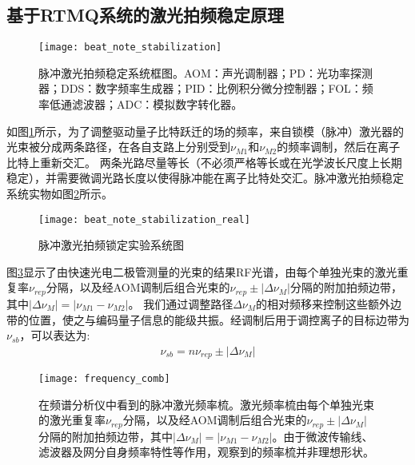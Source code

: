 \subsection[基于RTMQ系统的激光拍频稳定原理]{基于RTMQ系统的激光拍频稳定原理}

\begin{figure}
    \centering
    \caption[脉冲激光拍频稳定系统框图]{脉冲激光拍频稳定系统框图。AOM：声光调制器；PD：光功率探测器；DDS：数字频率生成器；PID：比例积分微分控制器；FOL：频率低通滤波器；ADC：模拟数字转化器。\label{fig:beat_note_stabilization}}
    \texttt{[image: beat\_note\_stabilization]}
\end{figure}

如图\ref{fig:beat_note_stabilization}所示，为了调整驱动量子比特跃迁的场的频率，来自锁模（脉冲）激光器的光束被分成两条路径，在各自支路上分别受到$\nu_{M1}$和$\nu_{M2}$的频率调制，然后在离子比特上重新交汇。
两条光路尽量等长（不必须严格等长或在光学波长尺度上长期稳定），并需要微调光路长度以使得脉冲能在离子比特处交汇。脉冲激光拍频稳定系统实物如图\ref{fig:beat_note_stabilization_real}所示。

\begin{figure}
    \centering
    \caption[脉冲激光拍频锁定实验系统图]{脉冲激光拍频锁定实验系统图\label{fig:beat_note_stabilization_real}}
    \texttt{[image: beat\_note\_stabilization\_real]}
\end{figure}

图\ref{fig:frequency_comb}显示了由快速光电二极管测量的光束的结果RF光谱，由每个单独光束的激光重复率$\nu_{rep}$分隔，以及经AOM调制后组合光束的$\nu_{rep}\pm |\Delta \nu_M|$分隔的附加拍频边带，其中$|\Delta \nu_M|=|\nu_{M1}-\nu_{M2}|$。
我们通过调整路径$\Delta\nu_M$的相对频移来控制这些额外边带的位置，使之与编码量子信息的能级共振。经调制后用于调控离子的目标边带为$\nu_{sb}$，可以表达为:
\begin{align}
    \nu_{sb}=n\nu_{rep}\pm|\Delta\nu_M|
\end{align}

\begin{figure}
    \centering
    \caption[脉冲激光频率梳]{在频谱分析仪中看到的脉冲激光频率梳。激光频率梳由每个单独光束的激光重复率$\nu_{rep}$分隔，以及经AOM调制后组合光束的$\nu_{rep}\pm |\Delta \nu_M|$分隔的附加拍频边带，其中$|\Delta \nu_M|=|\nu_{M1}-\nu_{M2}|$。由于微波传输线、滤波器及网分自身频率特性等作用，观察到的频率梳并非理想形状。\label{fig:frequency_comb}}
    \texttt{[image: frequency\_comb]}
\end{figure}

